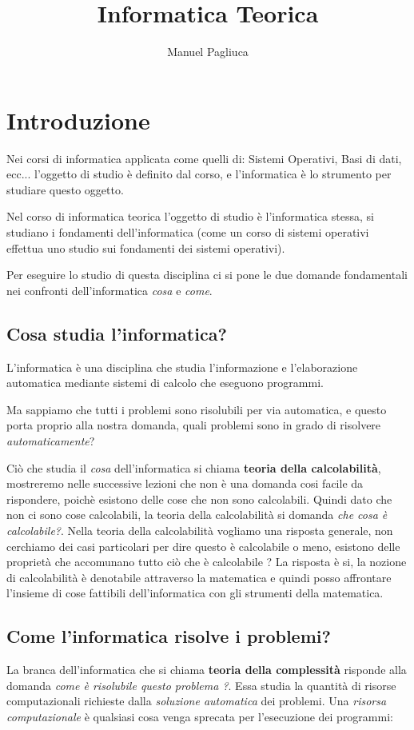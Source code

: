 \documentclass{article}
\title{\textbf{Informatica Teorica}}
\author{Manuel Pagliuca}
\begin{document}
\maketitle
\pagebreak
\tableofcontents
\pagebreak
\newpage
\section{Introduzione}
Nei corsi di informatica applicata come quelli di: Sistemi Operativi, Basi di dati, ecc... l'oggetto di studio è definito dal corso, e l'informatica è lo strumento per studiare questo oggetto.

Nel corso di informatica teorica l'oggetto di studio è l'informatica stessa, si studiano i fondamenti dell'informatica (come un corso di sistemi operativi effettua uno studio sui fondamenti dei sistemi operativi).

Per eseguire lo studio di questa disciplina ci si pone le due domande fondamentali nei confronti dell'informatica \textit{cosa} e \textit{come}.
\subsection{Cosa studia l'informatica?}
L'informatica è una disciplina che studia l'informazione e l'elaborazione automatica mediante sistemi di calcolo che eseguono programmi.

Ma sappiamo che tutti i problemi sono risolubili per via automatica, e questo porta proprio alla nostra domanda, quali problemi sono in grado di risolvere \textit{automaticamente}?

Ciò che studia il \textit{cosa} dell'informatica si chiama \textbf{teoria della calcolabilità}, mostreremo nelle successive lezioni che non è una domanda cosi facile da rispondere, poichè esistono delle cose che non sono calcolabili. Quindi dato che non ci sono cose calcolabili, la teoria della calcolabilità si domanda \textit{che cosa è calcolabile?}.
\newline
Nella teoria della calcolabilità vogliamo una risposta generale, non cerchiamo dei casi particolari per dire questo è calcolabile o meno, esistono delle proprietà che accomunano tutto ciò che è calcolabile ? La risposta è si, la nozione di calcolabilità è denotabile attraverso la matematica e quindi posso affrontare l'insieme di cose fattibili dell'informatica con gli strumenti della matematica.
\subsection{Come l'informatica risolve i problemi?}
La branca dell'informatica che si chiama \textbf{teoria della complessità} risponde alla domanda \textit{come è risolubile questo problema ?}. Essa studia la quantità di risorse computazionali richieste dalla \textit{soluzione automatica} dei problemi. Una \textit{risorsa computazionale} è qualsiasi cosa venga sprecata per l'esecuzione dei programmi:
\end{document}

